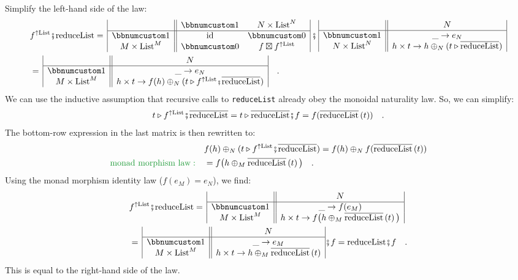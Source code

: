 Simplify the left-hand side of the law:
\begin{align*}
 & f^{\uparrow\text{List}}\bef\text{reduceList}=\,\begin{array}{|c||cc|}
 & \bbnum 1 & N\times\text{List}^{N}\\
\hline \bbnum 1 & \text{id} & \bbnum 0\\
M\times\text{List}^{M} & \bbnum 0 & f\boxtimes f^{\uparrow\text{List}}
\end{array}\,\bef\,\begin{array}{|c||c|}
 & N\\
\hline \bbnum 1 & \_\rightarrow e_{N}\\
N\times\text{List}^{N} & h\times t\rightarrow h\oplus_{N}(t\triangleright\overline{\text{reduceList}})
\end{array}\\
 & =\,\begin{array}{|c||c|}
 & N\\
\hline \bbnum 1 & \_\rightarrow e_{N}\\
M\times\text{List}^{M} & h\times t\rightarrow f(h)\oplus_{N}(t\triangleright f^{\uparrow\text{List}}\bef\overline{\text{reduceList}})
\end{array}\quad.
\end{align*}
We can use the inductive assumption that recursive calls to \lstinline!reduceList!
already obey the monoidal naturality law. So, we can simplify:
\[
t\triangleright f^{\uparrow\text{List}}\bef\overline{\text{reduceList}}=t\triangleright\overline{\text{reduceList}}\bef f=f(\overline{\text{reduceList}}\left(t\right))\quad.
\]
The bottom-row expression in the last matrix is then rewritten to:
\begin{align*}
 & f(h)\oplus_{N}(t\triangleright f^{\uparrow\text{List}}\bef\overline{\text{reduceList}})=f(h)\oplus_{N}f(\overline{\text{reduceList}}\left(t\right))\\
{\color{greenunder}\text{monad morphism law}:}\quad & =f\big(h\oplus_{M}\overline{\text{reduceList}}\left(t\right)\big)\quad.
\end{align*}
Using the monad morphism identity law ($f(e_{M})=e_{N}$), we find:
\begin{align*}
 & f^{\uparrow\text{List}}\bef\text{reduceList}=\,\begin{array}{|c||c|}
 & N\\
\hline \bbnum 1 & \_\rightarrow f(e_{M})\\
M\times\text{List}^{M} & h\times t\rightarrow f\big(h\oplus_{M}\overline{\text{reduceList}}\left(t\right)\big)
\end{array}\\
 & =\,\begin{array}{|c||c|}
 & N\\
\hline \bbnum 1 & \_\rightarrow e_{M}\\
M\times\text{List}^{M} & h\times t\rightarrow h\oplus_{M}\overline{\text{reduceList}}\left(t\right)
\end{array}\bef f=\text{reduceList}\bef f\quad.
\end{align*}
 This is equal to the right-hand side of the law.


